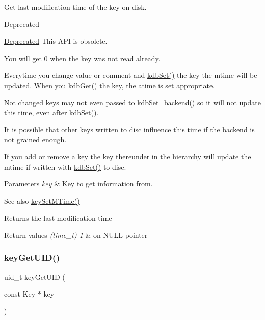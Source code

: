 Get last modification time of the key on disk. 

\begin{DoxyRefDesc}{Deprecated}
\item[\hyperlink{deprecated__deprecated000022}{Deprecated}]This A\+PI is obsolete.\end{DoxyRefDesc}


You will get 0 when the key was not read already.

Everytime you change value or comment and \hyperlink{group__kdb_ga11436b058408f83d303ca5e996832bcf}{kdb\+Set()} the key the mtime will be updated. When you \hyperlink{group__kdb_ga28e385fd9cb7ccfe0b2f1ed2f62453a1}{kdb\+Get()} the key, the atime is set appropriate.

Not changed keys may not even passed to kdb\+Set\+\_\+backend() so it will not update this time, even after \hyperlink{group__kdb_ga11436b058408f83d303ca5e996832bcf}{kdb\+Set()}.

It is possible that other keys written to disc influence this time if the backend is not grained enough.

If you add or remove a key the key thereunder in the hierarchy will update the mtime if written with \hyperlink{group__kdb_ga11436b058408f83d303ca5e996832bcf}{kdb\+Set()} to disc.


\begin{DoxyParams}{Parameters}
{\em key} & Key to get information from. \\
\hline
\end{DoxyParams}
\begin{DoxySeeAlso}{See also}
\hyperlink{group__meta_ga481d8997187992fe4bbf288bc8ef4db7}{key\+Set\+M\+Time()} 
\end{DoxySeeAlso}
\begin{DoxyReturn}{Returns}
the last modification time 
\end{DoxyReturn}

\begin{DoxyRetVals}{Return values}
{\em (time\+\_\+t)-\/1} & on N\+U\+LL pointer \\
\hline
\end{DoxyRetVals}
\mbox{\label{group__meta_gacaa5060e67b03f50ae49a3620c54bc46}} 
\subsubsection{\texorpdfstring{key\+Get\+U\+I\+D()}{keyGetUID()}}
{\footnotesize\ttfamily uid\+\_\+t key\+Get\+U\+ID (\begin{DoxyParamCaption}\item[{const Key $\ast$}]{key }\end{DoxyParamCaption})}



